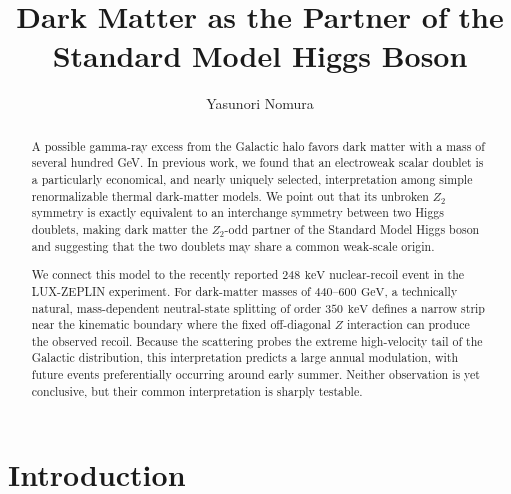 \documentclass[aps,prd,twocolumn,nofootinbib,superscriptaddress]{revtex4-2}
\newcommand{\GeV}{\,\mathrm{GeV}}
\newcommand{\keV}{\,\mathrm{keV}}
\begin{document}
\title{Dark Matter as the  Partner of the Standard Model Higgs Boson}

\author{Yasunori Nomura}


\begin{abstract}
A possible gamma-ray excess from the Galactic halo favors dark matter with a mass of several hundred GeV. In previous work, we found that an electroweak scalar doublet is a particularly economical, and nearly uniquely selected, interpretation among simple renormalizable thermal dark-matter models. We point out that its unbroken $Z_2$ symmetry is exactly equivalent to an interchange symmetry between two Higgs doublets, making dark matter the $Z_2$-odd partner of the Standard Model Higgs boson and suggesting that the two doublets may share a common weak-scale origin.

We connect this model to the recently reported $248~\keV$ nuclear-recoil event in the LUX-ZEPLIN experiment. For dark-matter masses of $440$--$600~\GeV$, a technically natural, mass-dependent neutral-state splitting of order $350~\keV$ defines a narrow strip near the kinematic boundary where the fixed off-diagonal $Z$ interaction can produce the observed recoil. Because the scattering probes the extreme high-velocity tail of the Galactic distribution, this interpretation predicts a large annual modulation, with future events preferentially occurring around early summer. Neither observation is yet conclusive, but their common interpretation is sharply testable.
\end{abstract}

\maketitle


\section{Introduction}
\end{document}
